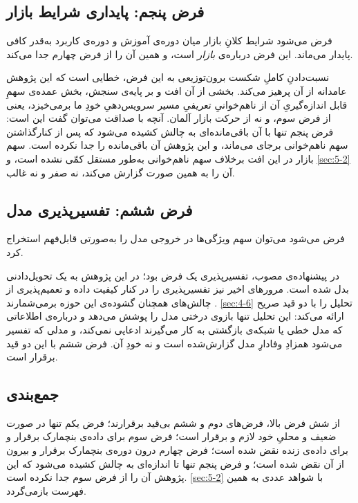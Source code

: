\subsection*{فرض پنجم: پایداری شرایط بازار}

فرض می‌شود شرایط کلانِ بازار میان دوره‌ی آموزش و دوره‌ی کاربرد به‌قدر کافی پایدار
می‌ماند. این فرض درباره‌ی \emph{بازار} است، و همین آن را از فرض چهارم جدا می‌کند.

نسبت‌دادنِ کاملِ شکست برون‌توزیعی به این فرض، خطایی است که این پژوهش عامدانه از آن
پرهیز می‌کند. بخشی از آن افت  و بر پایه‌ی سنجش، بخش عمده‌ی سهمِ قابل اندازه‌گیریِ
آن  از ناهم‌خوانیِ تعریفیِ مسیر سرویس‌دهیِ خودِ ما برمی‌خیزد، یعنی از فرض سوم،
و نه از حرکت بازار آلمان. آنچه با صداقت می‌توان گفت این است: فرض پنجم تنها با آن
باقی‌مانده‌ای به چالش کشیده می‌شود که پس از کنارگذاشتن سهم ناهم‌خوانی برجای می‌ماند،
و این پژوهش آن باقی‌مانده را جدا نکرده است. سهم بازار در این افت  برخلاف سهم
ناهم‌خوانی  به‌طور مستقل کمّی نشده است، و \cref{sec:5-2} آن را به همین صورت گزارش
می‌کند، نه صفر و نه غالب.

\subsection*{فرض ششم: تفسیرپذیری مدل}

فرض می‌شود می‌توان سهم ویژگی‌ها در خروجی مدل را به‌صورتی قابل‌فهم استخراج کرد.

در پیشنهاده‌ی مصوب، تفسیرپذیری یک فرض بود؛ در این پژوهش به یک تحویل‌دادنی بدل شده
است. مرورهای اخیر نیز تفسیرپذیری را در کنار کیفیت داده و تعمیم‌پذیری از چالش‌های
همچنان گشوده‌ی این حوزه برمی‌شمارند \cite{oconnor_review_2025}. \cref{sec:4-6} تحلیل
 را با دو قید صریح ارائه می‌کند: این تحلیل تنها بازوی درختی مدل را پوشش
می‌دهد و درباره‌ی اطلاعاتی که مدل خطی یا شبکه‌ی بازگشتی به کار می‌گیرند ادعایی نمی‌کند،
و مدلی که تفسیر می‌شود همزادِ وفادارِ مدل گزارش‌شده است و نه خودِ آن. فرض ششم با این
دو قید برقرار است.

\subsection*{جمع‌بندی}

از شش فرض بالا، فرض‌های دوم و ششم بی‌قید برقرارند؛ فرض یکم تنها در صورت ضعیف و محلیِ
خود لازم و برقرار است؛ فرض سوم برای داده‌ی بنچمارک برقرار و برای داده‌ی زنده نقض شده
است؛ فرض چهارم درون دوره‌ی بنچمارک برقرار و بیرون از آن نقض شده است؛ و فرض پنجم تنها
تا اندازه‌ای به چالش کشیده می‌شود که این پژوهش آن را از فرض سوم جدا نکرده است. \cref{sec:5-2} با شواهد عددی به همین فهرست بازمی‌گردد.
